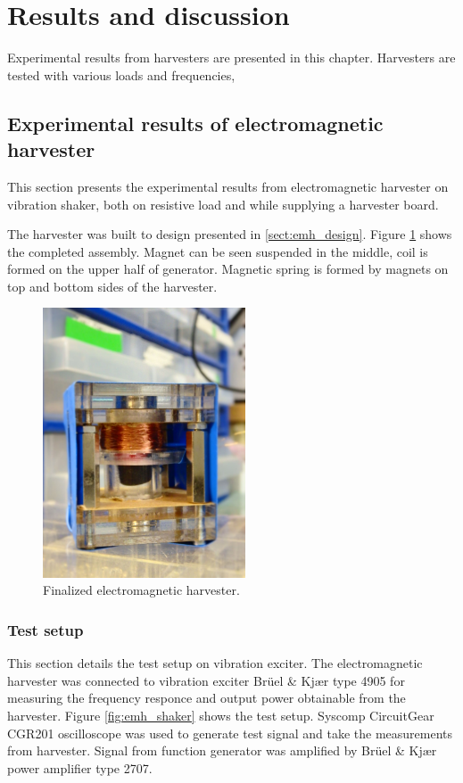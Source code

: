 \section{Results and discussion}
Experimental results from harvesters are presented in this chapter. Harvesters are tested with various loads and frequencies, 

\subsection{Experimental results of electromagnetic harvester}
This section presents the experimental results from electromagnetic harvester on vibration shaker, both on resistive load and while supplying a harvester board. 

The harvester was built to design presented in \ref{sect:emh_design}. Figure \ref{fig:emh_final} shows the completed assembly. Magnet can be seen suspended in the middle, coil is formed on the upper half of generator. Magnetic spring is formed by magnets on top and bottom sides of the harvester. 

\begin{figure}[htb]
\begin{center}
\includegraphics[height=8cm]{images/own_pic/inductive_harvester.jpg}
\end{center}
\caption{\label{fig:emh_final} Finalized electromagnetic harvester.}
\end{figure}


\subsubsection{Test setup}
This section details the test setup on vibration exciter. The electromagnetic harvester was connected to vibration exciter Brüel & Kjær type 4905 for measuring the frequency responce and output power obtainable from the harvester. Figure \ref{fig:emh_shaker} shows the test setup. Syscomp CircuitGear CGR201 oscilloscope was used to generate test signal and take the measurements from harvester. Signal from function generator was amplified by Brüel & Kjær power amplifier type 2707.

